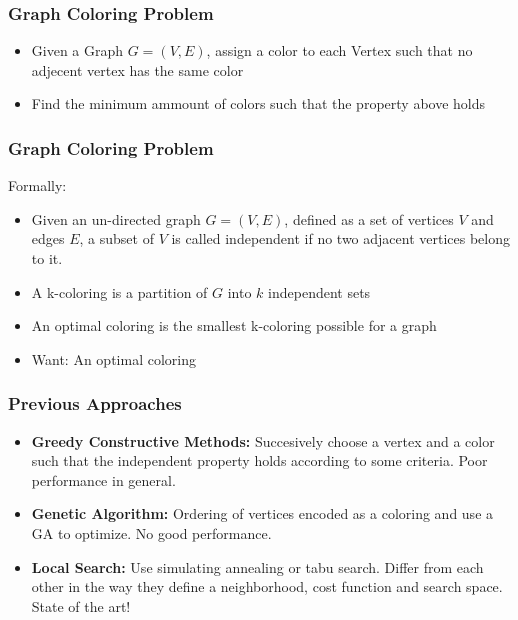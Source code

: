 \documentclass{beamer}
\begin{document}
\begin{frame}
\frametitle{Graph Coloring Problem}
\begin{itemize}
\item Given a Graph $G=(V,E)$, assign a color to each Vertex such that no adjecent vertex has the same color
\item Find the minimum ammount of colors such that the property above holds
\end{itemize}
\end{frame}

\begin{frame}
\frametitle{Graph Coloring Problem}
\large{Formally:}
\begin{itemize}
\item Given an un-directed graph $G=(V,E)$, defined as a set of vertices $V$ and edges $E$, a subset of $V$ is called independent if no two adjacent vertices belong to it.
\item A k-coloring is a partition of $G$ into $k$ independent sets
\item An optimal coloring is the smallest k-coloring possible for a graph
\item Want: An optimal coloring
\end{itemize}
\end{frame}

\begin{frame}
\frametitle{Previous Approaches}
\begin{itemize}
\item {\bf Greedy Constructive Methods:} Succesively choose a vertex and a color such that the independent property holds according to some criteria. Poor performance in general.
\item {\bf Genetic Algorithm:} Ordering of vertices encoded as a coloring and use a GA to optimize. No good performance.
\item {\bf Local Search:} Use simulating annealing or tabu search. Differ from each other in the way they define a neighborhood, cost function and search space. State of the art!
\end{itemize}
\end{frame}
\end{document}
